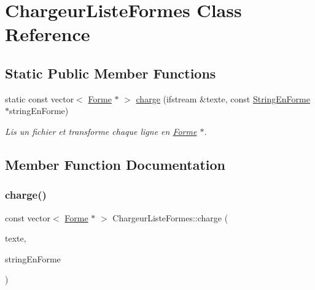 \hypertarget{class_chargeur_liste_formes}{}\section{Chargeur\+Liste\+Formes Class Reference}
\label{class_chargeur_liste_formes}
\subsection*{Static Public Member Functions}
\begin{DoxyCompactItemize}
\item 
static const vector$<$ \mbox{\hyperlink{class_forme}{Forme}} $\ast$ $>$ \mbox{\hyperlink{class_chargeur_liste_formes_aeaa4ce4978853f8ceedbc12606fb8db2}{charge}} (ifstream \&texte, const \mbox{\hyperlink{class_string_en_forme}{String\+En\+Forme}} $\ast$string\+En\+Forme)
\begin{DoxyCompactList}\small\item\em Lis un fichier et transforme chaque ligne en \mbox{\hyperlink{class_forme}{Forme}} $\ast$. \end{DoxyCompactList}\end{DoxyCompactItemize}


\subsection{Member Function Documentation}
\mbox{\label{class_chargeur_liste_formes_aeaa4ce4978853f8ceedbc12606fb8db2}} 
\subsubsection{\texorpdfstring{charge()}{charge()}}
{\footnotesize\ttfamily const vector$<$ \mbox{\hyperlink{class_forme}{Forme}} $\ast$ $>$ Chargeur\+Liste\+Formes\+::charge (\begin{DoxyParamCaption}\item[{ifstream \&}]{texte,  }\item[{const \mbox{\hyperlink{class_string_en_forme}{String\+En\+Forme}} $\ast$}]{string\+En\+Forme }\end{DoxyParamCaption})\hspace{0.3cm}{\ttfamily [static]}}



